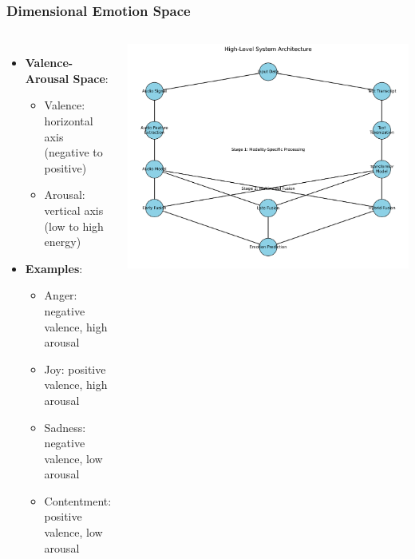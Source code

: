 \documentclass{beamer}
\begin{document}
\begin{frame}
\frametitle{Dimensional Emotion Space}
\begin{columns}
\begin{itemize}
    \item \textbf{Valence-Arousal Space}:
    \begin{itemize}
        \item Valence: horizontal axis (negative to positive)
        \item Arousal: vertical axis (low to high energy)
    \end{itemize}
    \item \textbf{Examples}:
    \begin{itemize}
        \item Anger: negative valence, high arousal
        \item Joy: positive valence, high arousal
        \item Sadness: negative valence, low arousal
        \item Contentment: positive valence, low arousal
    \end{itemize}
\end{itemize}

\includegraphics[width=\textwidth]{figures/system_architecture.png}
\end{columns}
\end{frame}
\end{document}
